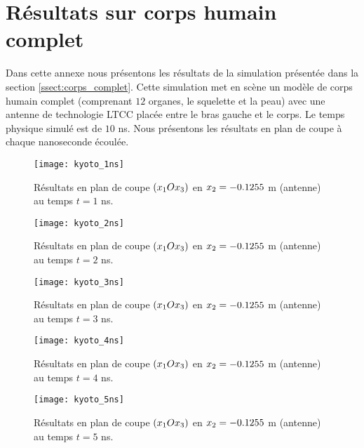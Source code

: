 \chapter{Résultats sur corps humain complet}
\label{annexe:kyoto}


Dans cette annexe nous présentons les résultats de la simulation
présentée dans la section \ref{ssect:corps_complet}.
Cette simulation met en scène un modèle de corps humain complet
(comprenant $12$ organes, le squelette et la peau)
avec une antenne de technologie LTCC placée entre le bras
gauche et le corps.
Le temps physique simulé est de $10$ ns.
Nous présentons les résultats en plan de coupe à
chaque nanoseconde écoulée.

\begin{figure}[!h]
	\centering
	\caption{
		\label{img:annexe_kyoto_cutplane_1ns}
		Résultats en plan de coupe $(x_1 O x_3)$
		en $x_2 = -0.1255$ m (antenne)
		au temps $t=1$ ns.
	}
	\texttt{[image: kyoto\_1ns]}
\end{figure}

\begin{figure}[!h]
	\centering
	\caption{
		\label{img:annexe_kyoto_cutplane_2ns}
		Résultats en plan de coupe $(x_1 O x_3)$
		en $x_2 = -0.1255$ m (antenne)
		au temps $t=2$ ns.
	}
	\texttt{[image: kyoto\_2ns]}
\end{figure}

\begin{figure}[!h]
	\centering
	\caption{
		\label{img:annexe_kyoto_cutplane_3ns}
		Résultats en plan de coupe $(x_1 O x_3)$
		en $x_2 = -0.1255$ m (antenne)
		au temps $t=3$ ns.
	}
	\texttt{[image: kyoto\_3ns]}
\end{figure}

\begin{figure}[!h]
	\centering
	\caption{
		\label{img:annexe_kyoto_cutplane_4ns}
		Résultats en plan de coupe $(x_1 O x_3)$
		en $x_2 = -0.1255$ m (antenne)
		au temps $t=4$ ns.
	}
	\texttt{[image: kyoto\_4ns]}
\end{figure}

\begin{figure}[!h]
	\centering
	\caption{
		\label{img:annexe_kyoto_cutplane_5ns}
		Résultats en plan de coupe $(x_1 O x_3)$
		en $x_2 = -0.1255$ m (antenne)
		au temps $t=5$ ns.
	}
	\texttt{[image: kyoto\_5ns]}
\end{figure}

